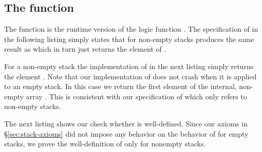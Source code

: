 
\subsection{The function \stacktop}

The function \stacktop is the runtime version of the logic function .
The specification of \stacktop in the following listing
simply states that for non-empty stacks
\stacktop produces the same result as \StackTop
which in turn just returns the element  of \stacktype.



For a non-empty stack the implementation of \stacktop in
the next listing simply returns the element .
Note that our implementation of \stacktop does not crash when it is applied
to an empty stack.
In this case we return the first element of the internal,
non-empty array .
This is consistent with our specification of \stacktop
which only refers to non-empty stacks.



The next listing shows our check whether \stacktop is well-defined.
Since our axioms in \S\ref{sec:stack-axioms} did not impose any
behavior on the behavior of \stacktop for empty stacks,
we prove the well-definition of \stacktop only for nonempty stacks.



